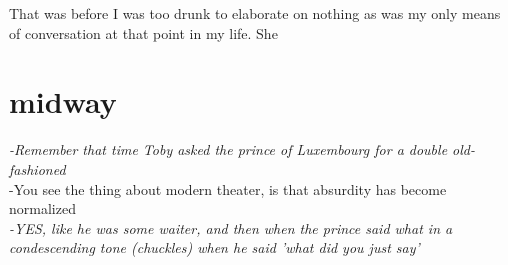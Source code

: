 That was before I was too drunk to elaborate on nothing as was my only means of
conversation at that point in my life. She 

\clearpage \section{midway}


\hfill \textit{\small{-Remember that time Toby asked the prince of Luxembourg
for a double old-fashioned}}\\

\hfill \small{-You see the thing about modern theater, is that absurdity has
become normalized}\\

\textit{\small{-YES, like he was some waiter, and then when the prince said
what in a condescending tone (chuckles) when he said 'what did you just
say'}}\\

